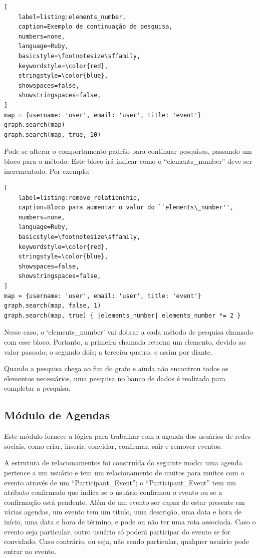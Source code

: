 \begin{lstlisting}[
    label=listing:elements_number,
    caption=Exemplo de continuação de pesquisa,
    numbers=none,
    language=Ruby,
    basicstyle=\footnotesize\sffamily,
    keywordstyle=\color{red},
    stringstyle=\color{blue},
    showspaces=false,
    showstringspaces=false,
]
map = {username: 'user', email: 'user', title: 'event'}
graph.search(map)
graph.search(map, true, 10)
\end{lstlisting}

Pode-se alterar o comportamento padrão para continuar pesquisas, passando um bloco para o método. Este bloco irá indicar como o ``elements\_number'' deve ser incrementado. Por exemplo:

\begin{lstlisting}[
    label=listing:remove_relationship,
    caption=Bloco para aumentar o valor do ``elements\_number'',
    numbers=none,
    language=Ruby,
    basicstyle=\footnotesize\sffamily,
    keywordstyle=\color{red},
    stringstyle=\color{blue},
    showspaces=false,
    showstringspaces=false,
]
map = {username: 'user', email: 'user', title: 'event'}
graph.search(map, false, 1)
graph.search(map, true) { |elements_number| elements_number *= 2 }
\end{lstlisting}

Nesse caso, o `elements\_number' vai dobrar a cada método de pesquisa chamado com esse bloco. Portanto, a primeira chamada retorna um elemento, devido ao valor passado; o segundo dois; a terceira quatro, e assim por diante.

Quando a pesquisa chega ao fim do grafo e ainda não encontrou todos os elementos necessários, uma pesquisa no banco de dados é realizada para completar a pesquisa.

\subsection{Módulo de Agendas}

Este módulo fornece a lógica para trabalhar com a agenda dos usuários de redes sociais, como criar, inserir, convidar, confirmar, sair e remover eventos.

A estrutura de relacionamentos foi construída do seguinte modo: uma agenda pertence a um usuário e tem um relacionamento de muitos para muitos com o evento através de um ``Participant\_Event''; o ``Participant\_Event'' tem um atributo confirmado que indica se o usuário confirmou o evento ou se a confirmação está pendente. Além de um evento ser capaz de estar presente em várias agendas, um evento tem um título, uma descrição, uma data e hora de início, uma data e hora de término, e pode ou não ter uma rota associada. Caso o evento seja particular, outro usuário só poderá participar do evento se for convidado. Caso contrário, ou seja, não sendo particular, qualquer usuário pode entrar no evento.

